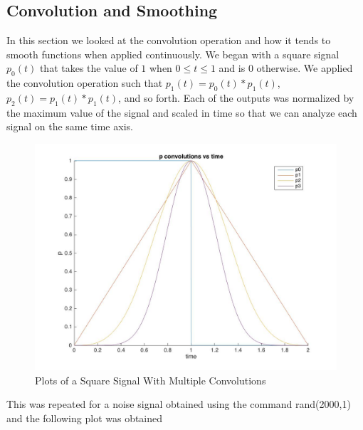 \documentclass{article}
\begin{document}
\FloatBarrier
\subsection{Convolution and Smoothing}

In this section we looked at the convolution operation and how it tends to smooth functions when applied continuously. We began with a square signal $p_0 (t)$ that takes the value of $1$ when $0 \leq t \leq 1$ and is $0$ otherwise. We applied the convolution operation such that $p_1(t) = p_0(t) * p_1(t)$,  $p_2(t) = p_1(t) * p_1(t)$, and so forth. Each of the outputs was normalized by the maximum value of the signal and scaled in time so that we can analyze each signal on the same time axis.

\begin{figure}[!htb]
    \centering
        \includegraphics[scale = 0.32]{part3pplot.jpg}
        \caption{Plots of a Square Signal With Multiple Convolutions}
\end{figure}

\FloatBarrier
This was repeated for a noise signal obtained using the command rand(2000,1) and the following plot was obtained
\end{document}
